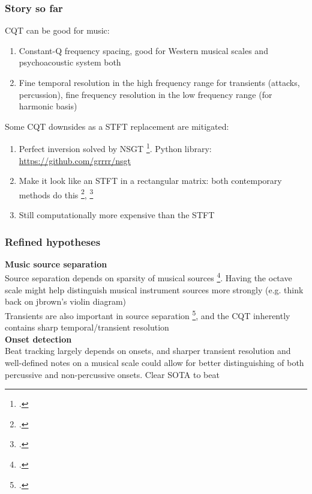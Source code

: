 \documentclass[usenames,dvipsnames]{beamer}
\begin{document}
\begin{frame}
	\frametitle{Story so far}
	CQT can be good for music:
	\begin{enumerate}
		\item
			Constant-Q frequency spacing, good for Western musical scales and psychoacoustic system both
		\item
			Fine temporal resolution in the high frequency range for transients (attacks, percussion), fine frequency resolution in the low frequency range (for harmonic basis)
	\end{enumerate}
	Some CQT downsides as a STFT replacement are mitigated:
	\begin{enumerate}
		\item
			Perfect inversion solved by NSGT \footcite{invertiblecqt}. Python library: \href{https://github.com/grrrr/nsgt}{https://github.com/grrrr/nsgt}
		\item
			Make it look like an STFT in a rectangular matrix: both contemporary methods do this \footcite{klapuricqt}, \footcite{invertiblecqt}
		\item
			Still computationally more expensive than the STFT
	\end{enumerate}
\end{frame}

\begin{frame}
	\frametitle{Refined hypotheses}
	\textbf{Music source separation}\\
	Source separation depends on sparsity of musical sources \footcite{musicsepgood}. Having the octave scale might help distinguish musical instrument sources more strongly (e.g. think back on jbrown's violin diagram)\\
	Transients are also important in source separation \footcite{transientsep}, and the CQT inherently contains sharp temporal/transient resolution\\
	\vspace{1em}
	\textbf{Onset detection}\\
	Beat tracking largely depends on onsets, and sharper transient resolution and well-defined notes on a musical scale could allow for better distinguishing of both percussive and non-percussive onsets. Clear SOTA to beat
\end{frame}
\end{document}
